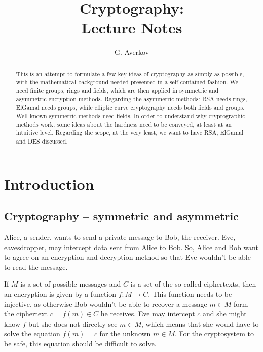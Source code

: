 \documentclass[11pt]{article}
\title{Cryptography: \\ Lecture Notes}
\author{G. Averkov}
\theoremstyle{plain}
\theoremstyle{definition}
\begin{document}
	
	
\maketitle 

\begin{abstract} 
	This is an attempt to formulate a few key ideas of cryptography as simply as possible, with the mathematical background needed presented in a self-contained fashion. We need finite groups, rings and fields, which are then applied in symmetric and asymmetric encryption methods. Regarding the asymmetric methods: RSA needs rings, ElGamal needs groups, while elliptic curve cryptography needs both fields and groups. Well-known symmetric methods need fields. In order to understand why cryptographic methods work, some ideas about the hardness need to be conveyed, at least at an intuitive level. 
	Regarding the scope, at the very least, we want to have RSA, ElGamal and DES discussed. 
\end{abstract} 

	
\setcounter{section}{-1}
\section{Introduction}

\subsection{Cryptography -- symmetric and asymmetric}

 
Alice, a  sender, wants to send a private message to Bob, the receiver. Eve, eavesdropper, may intercept data sent from Alice to Bob. So, Alice and Bob want to agree on an encryption and decryption method so that Eve wouldn't be able to read the message. 

 If $M$ is a set of possible messages and $C$ is a set of the so-called ciphertexts, then an encryption is given by a function $f: M \to C$. This function needs to be injective, as otherwise Bob wouldn't be able to recover a message $m \in M$ form the ciphertext $c = f(m) \in C$ he receives. Eve may intercept $c$ and she might know $f$ but she does not directly see $m \in M$, which means that she would have to solve the equation $f(m) = c$ for the unknown $m \in M$. For the cryptosystem to be safe, this equation should be difficult to solve. 
 
\end{document}
